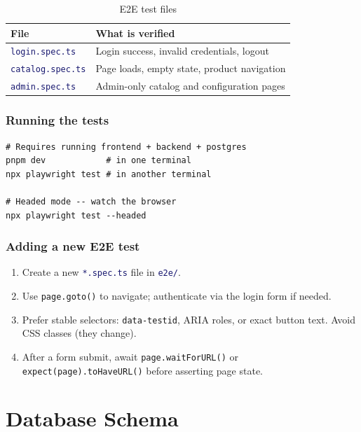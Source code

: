 \documentclass[12pt,a4paper,twoside]{report}
\newcommand{\code}[1]{\texttt{#1}}
\newcommand{\file}[1]{\texttt{\textcolor{MidnightBlue}{#1}}}
\begin{document}
\begin{table}[H]
  \centering
  \caption{E2E test files}
  \begin{tabular}{@{}ll@{}}
    \toprule
    \textbf{File} & \textbf{What is verified} \\
    \midrule
    \file{login.spec.ts}   & Login success, invalid credentials, logout \\
    \file{catalog.spec.ts} & Page loads, empty state, product navigation \\
    \file{admin.spec.ts}   & Admin-only catalog and configuration pages \\
    \bottomrule
  \end{tabular}
\end{table}

\subsection*{Running the tests}

\begin{lstlisting}[style=bash]
# Requires running frontend + backend + postgres
pnpm dev            # in one terminal
npx playwright test # in another terminal

# Headed mode -- watch the browser
npx playwright test --headed
\end{lstlisting}

\subsection*{Adding a new E2E test}

\begin{enumerate}
  \item Create a new \file{*.spec.ts} file in \file{e2e/}.
  \item Use \code{page.goto()} to navigate; authenticate via the login
        form if needed.
  \item Prefer stable selectors: \code{data-testid}, ARIA roles, or
        exact button text. Avoid CSS classes (they change).
  \item After a form submit, await \code{page.waitForURL()} or
        \code{expect(page).toHaveURL()} before asserting page state.
\end{enumerate}

\chapter{Database Schema}
\label{ch:db-schema}
\end{document}
